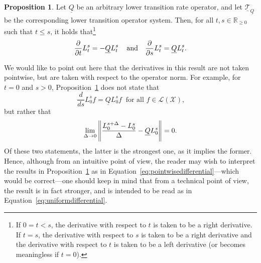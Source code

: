 \documentclass[10pt,a4paper]{paper}
\theoremstyle{definition}
\newtheorem{proposition}[theorem]{Proposition}
\newcommand{\reals}{\mathbb{R}}
\newcommand{\realsnonneg}{\reals_{\geq 0}}
\newcommand{\states}{\mathcal{X}}
\newcommand{\lbound}{L}
\newcommand{\gambles}{\mathcal{L}}
\newcommand{\gamblesX}{\gambles(\states)}
\newcommand{\lrate}{\underline{Q}}
\newcommand{\norm}[1]{\left\lVert #1 \right\rVert}
\begin{document}
\begin{proposition}\label{prop:lower_transition_has_deriv}
Let $\lrate$ be an arbitrary lower transition rate operator, and let $\underline{\mathcal{T}}_{\lrate}$ be the corresponding lower transition operator system. Then, for all $t,s\in\realsnonneg$ such that $t\leq s$, it holds that\footnote{If $0=t<s$, the derivative with respect to $t$ is taken to be a right derivative. If $t=s$, the derivative with respect to $s$ is taken to be a right derivative and the derivative with respect to $t$ is taken to be a left derivative (or becomes meaningless if $t=0$).}
\begin{equation*}
\frac{\partial}{\partial t}\lbound_t^s=-\lrate\lbound_t^s\,\quad\text{and}\quad\frac{\partial}{\partial s}\lbound_t^s=\lrate\lbound_t^s.\vspace{7pt}
\end{equation*}
\end{proposition}
We would like to point out here that the derivatives in this result are not taken pointwise, but are taken with respect to the operator norm. For example, for $t=0$ and $s>0$, Proposition~\ref{prop:lower_transition_has_deriv} does not state that
\vspace{3pt}
\begin{equation}\label{eq:pointwisedifferential}
\frac{d}{d s}\lbound_0^sf=\lrate\lbound_0^sf
~\text{ for all $f\in\gamblesX$,}
\end{equation}
but rather that
\begin{equation}\label{eq:uniformdifferential}
\lim_{\Delta\to0}
\norm{\frac{L_0^{s+\Delta}-L_0^s}{\Delta}-\lrate L_0^s}=0.\vspace{9pt}
\end{equation}
Of these two statements, the latter is the strongest one, as it implies the former. Hence, although from an intuitive point of view, the reader may wish to interpret the results in Proposition~\ref{prop:lower_transition_has_deriv} as in Equation~\eqref{eq:pointwisedifferential}---which would be correct---one should keep in mind that from a technical point of view, the result is in fact stronger, and is intended to be read as in Equation~\eqref{eq:uniformdifferential}.
\end{document}
